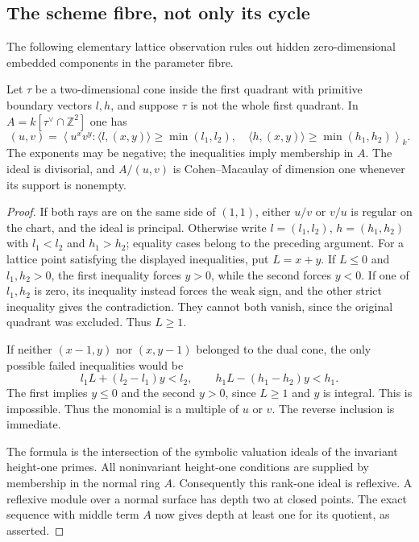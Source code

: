 \subsection{The scheme fibre, not only its cycle}
The following elementary lattice observation rules out hidden
zero-dimensional embedded components in the parameter fibre.

\begin{lemma}
\label{lem:coordinate-ideal-v170}
Let $\tau$ be a two-dimensional cone inside the first quadrant with
primitive boundary vectors $l,h$, and suppose $\tau$ is not the
whole first quadrant. In $A=k[\tau^\vee\cap\mathbb Z^2]$ one has
\begin{equation}\label{eq:fibre-divisorial-v170}
 (u,v)=\left\langle u^xv^y:
 \langle l,(x,y)\rangle\geq\min(l_1,l_2),\quad
 \langle h,(x,y)\rangle\geq\min(h_1,h_2)\right\rangle_k.
\end{equation}
The exponents may be negative; the inequalities imply membership in
$A$. The ideal is divisorial, and $A/(u,v)$ is Cohen--Macaulay of
dimension one whenever its support is nonempty.
\end{lemma}
\begin{proof}
If both rays are on the same side of $(1,1)$, either $u/v$ or $v/u$
is regular on the chart, and the ideal is principal. Otherwise write
$l=(l_1,l_2)$, $h=(h_1,h_2)$ with
$l_1<l_2$ and $h_1>h_2$; equality cases belong to the preceding
argument. For a lattice point satisfying the displayed inequalities,
put $L=x+y$. If $L\leq0$ and $l_1,h_2>0$, the first inequality
forces $y>0$, while the second forces $y<0$. If one of $l_1,h_2$
is zero, its inequality instead forces the weak sign, and the other
strict inequality gives the contradiction. They cannot both vanish,
since the original quadrant was excluded. Thus $L\geq1$.

If neither $(x-1,y)$ nor $(x,y-1)$ belonged to the dual cone, the
only possible failed inequalities would be
\[
 l_1L+(l_2-l_1)y<l_2,
 \qquad h_1L-(h_1-h_2)y<h_1.
\]
The first implies $y\leq0$ and the second $y>0$, since $L\geq1$
and $y$ is integral. This is impossible. Thus the monomial is a
multiple of $u$ or $v$. The reverse inclusion is immediate.

The formula is the intersection of the symbolic valuation ideals
of the invariant height-one primes. All noninvariant height-one
conditions are supplied by membership in the normal ring $A$.
Consequently this rank-one ideal is reflexive. A reflexive module
over a normal surface has depth two at closed points. The exact
sequence with middle term $A$ now gives depth at least one for its
quotient, as asserted.
\end{proof}

